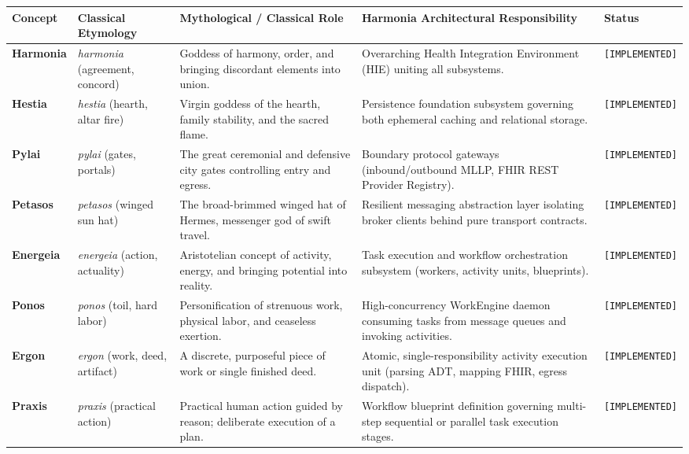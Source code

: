 \begin{table}[htbp]
\centering
\scriptsize
\begin{tabularx}{\textwidth}{l p{2.2cm} p{3.2cm} Y l}
\toprule
\textbf{Concept} & \textbf{Classical Etymology} & \textbf{Mythological / Classical Role} & \textbf{Harmonia Architectural Responsibility} & \textbf{Status} \\
\midrule
\textbf{Harmonia} & \textit{harmonia} (agreement, concord) & Goddess of harmony, order, and bringing discordant elements into union. & Overarching Health Integration Environment (HIE) uniting all subsystems. & \texttt{[IMPLEMENTED]} \\
\addlinespace
\textbf{Hestia} & \textit{hestia} (hearth, altar fire) & Virgin goddess of the hearth, family stability, and the sacred flame. & Persistence foundation subsystem governing both ephemeral caching and relational storage. & \texttt{[IMPLEMENTED]} \\
\addlinespace
\textbf{Pylai} & \textit{pylai} (gates, portals) & The great ceremonial and defensive city gates controlling entry and egress. & Boundary protocol gateways (inbound/outbound MLLP, FHIR REST Provider Registry). & \texttt{[IMPLEMENTED]} \\
\addlinespace
\textbf{Petasos} & \textit{petasos} (winged sun hat) & The broad-brimmed winged hat of Hermes, messenger god of swift travel. & Resilient messaging abstraction layer isolating broker clients behind pure transport contracts. & \texttt{[IMPLEMENTED]} \\
\addlinespace
\textbf{Energeia} & \textit{energeia} (action, actuality) & Aristotelian concept of activity, energy, and bringing potential into reality. & Task execution and workflow orchestration subsystem (workers, activity units, blueprints). & \texttt{[IMPLEMENTED]} \\
\addlinespace
\textbf{Ponos} & \textit{ponos} (toil, hard labor) & Personification of strenuous work, physical labor, and ceaseless exertion. & High-concurrency WorkEngine daemon consuming tasks from message queues and invoking activities. & \texttt{[IMPLEMENTED]} \\
\addlinespace
\textbf{Ergon} & \textit{ergon} (work, deed, artifact) & A discrete, purposeful piece of work or single finished deed. & Atomic, single-responsibility activity execution unit (parsing ADT, mapping FHIR, egress dispatch). & \texttt{[IMPLEMENTED]} \\
\addlinespace
\textbf{Praxis} & \textit{praxis} (practical action) & Practical human action guided by reason; deliberate execution of a plan. & Workflow blueprint definition governing multi-step sequential or parallel task execution stages. & \texttt{[IMPLEMENTED]} \\

\end{tabularx}
\end{table}
